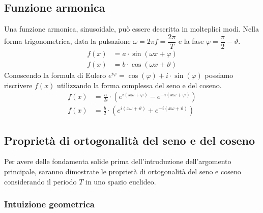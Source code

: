 \subsection{Funzione armonica}
Una funzione armonica, sinusoidale, pu\`o essere descritta in molteplici modi.
Nella forma trigonometrica, data la pulsazione \(\omega = 2\pi f = \dfrac{2\pi}{T}\)
e la fase \(\varphi = \dfrac{\pi}{2} - \vartheta\).
\begin{align*}
    f(x) &= a\cdot\sin (\omega x + \varphi) \\
    f(x) &= b\cdot\cos(\omega x + \vartheta)
\end{align*}
Conoscendo la formula di Eulero 
\(
    e^{i\varphi} = \cos(\varphi) + i\cdot\sin(\varphi)
\)
possiamo riscrivere \(f(x)\) utilizzando la forma complessa del seno e del coseno.
\begin{align*}
    f(x) &= \frac{a}{2i}\cdot(e^{i(x\omega + \varphi)} - e^{-i(x\omega + \varphi)}) \\
    f(x) &= \frac{b}{2}\cdot(e^{i(x\omega + \vartheta)} + e^{-i(x\omega + \vartheta)})
\end{align*}

\subsection{Propriet\`a di ortogonalit\`a del seno e del coseno}
Per avere delle fondamenta solide prima dell'introduzione dell'argomento
principale, saranno dimostrate le propriet\`a di ortogonalit\`a del seno e
coseno considerando il periodo \(T\) in uno spazio euclideo.

\subsubsection{Intuizione geometrica}

